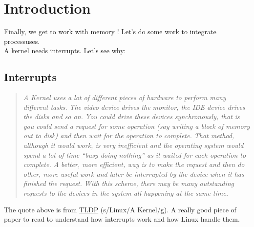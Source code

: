 \documentclass{42-en}
\begin{document}
\chapter{Introduction}
	Finally, we get to work with memory ! Let's do some work to integrate processuses.\\
	A kernel needs interrupts. Let's see why:
	\section{Interrupts}
	\begin{quotation}
		\textit{A Kernel uses a lot of different pieces of hardware to
          perform many different tasks. The video device drives the
          monitor, the IDE device drives the disks and so on. You
          could drive these devices synchronously, that is you could
          send a request for some operation (say writing a block of
          memory out to disk) and then wait for the operation to
          complete. That method, although it would work, is very
          inefficient and the operating system would spend a lot of
          time “busy doing nothing” as it waited for each operation to
          complete. A better, more efficient, way is to make the
          request and then do other, more useful work and later be
          interrupted by the device when it has finished the
          request. With this scheme, there may be many outstanding
          requests to the devices in the system all happening at the
          same time.}

	\end{quotation}
	The quote above is from
    \href{http://www.tldp.org/LDP/tlk/dd/interrupts.html}{TLDP}
    (s/Linux/A Kernel/g). A really good piece of paper to read to
    understand how interrupts work and how Linux handle them.
\end{document}
